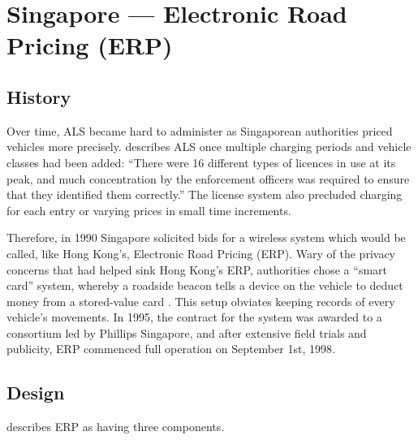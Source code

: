 \section{Singapore --- Electronic Road Pricing (ERP)}

\subsection{History}

Over time, ALS became hard to administer as Singaporean authorities priced vehicles more precisely. \citet[p. 4]{Chin2009} describes ALS once multiple charging periods and vehicle classes had been added: ``There were 16 different types of licences in use at its peak, and much concentration by the enforcement officers was required to ensure that they identified them correctly.'' The license system also precluded charging for each entry or varying prices in small time increments.

Therefore, in 1990 Singapore solicited bids for a wireless system which would be called, like Hong Kong's, Electronic Road Pricing (ERP). Wary of the privacy concerns that had helped sink Hong Kong's ERP, authorities chose a ``smart card'' system, whereby a roadside beacon tells a device on the vehicle to deduct money from a stored-value card \citep{PhangToh1997,Chin2009}. This setup obviates keeping records of every vehicle's movements. In 1995, the contract for the system was awarded to a consortium led by Phillips Singapore, and after extensive field trials and publicity, ERP commenced full operation on September 1st, 1998.

\subsection{Design}

\citet{Menon2004} describes ERP as having three components.

